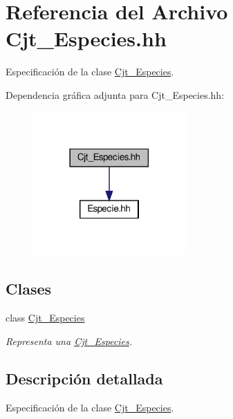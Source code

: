 \hypertarget{_cjt___especies_8hh}{}\section{Referencia del Archivo Cjt\+\_\+\+Especies.\+hh}
\label{_cjt___especies_8hh}


Especificación de la clase \hyperlink{class_cjt___especies}{Cjt\+\_\+\+Especies}.  


Dependencia gráfica adjunta para Cjt\+\_\+\+Especies.\+hh\+:\nopagebreak
\begin{figure}[H]
\begin{center}
\leavevmode
\includegraphics[width=165pt]{_cjt___especies_8hh__incl}
\end{center}
\end{figure}
\subsection*{Clases}
\begin{DoxyCompactItemize}
\item 
class \hyperlink{class_cjt___especies}{Cjt\+\_\+\+Especies}
\begin{DoxyCompactList}\small\item\em Representa una \hyperlink{class_cjt___especies}{Cjt\+\_\+\+Especies}. \end{DoxyCompactList}\end{DoxyCompactItemize}


\subsection{Descripción detallada}
Especificación de la clase \hyperlink{class_cjt___especies}{Cjt\+\_\+\+Especies}. 

